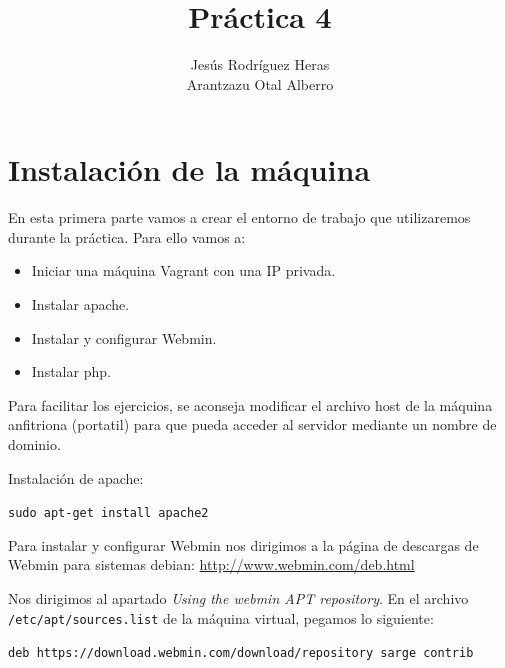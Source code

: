 \documentclass[12pt,letterpaper]{article}
\title{Práctica 4}
\author{Jesús Rodríguez Heras\\
	Arantzazu Otal Alberro}
\begin{document}
	
	\maketitle
%			
	\thispagestyle{empty}
	\newpage
	
	
	
	
	
	\lstset{language=bash, numbers=left, numberstyle=\tiny, numbersep=10pt, firstnumber=1, stepnumber=1, basicstyle=\small\ttfamily, tabsize=1, extendedchars=true, inputencoding=utf8/latin1, breaklines=true}
	
\section{Instalación de la máquina}
En esta primera parte vamos a crear el entorno de trabajo que utilizaremos durante la práctica. Para ello vamos a:
\begin{itemize}
	\item Iniciar una máquina Vagrant con una IP privada.
	\item Instalar apache.
	\item Instalar y configurar Webmin.
	\item Instalar php.
\end{itemize}

Para facilitar los ejercicios, se aconseja modificar el archivo host de la máquina anfitriona (portatil) para que pueda acceder al servidor mediante un nombre de dominio.

Instalación de apache:
\begin{center}
	\texttt{sudo apt-get install apache2}
\end{center}

Para instalar y configurar Webmin nos dirigimos a la página de descargas de Webmin para sistemas debian: \url{http://www.webmin.com/deb.html}

Nos dirigimos al apartado \textit{Using the webmin APT repository}. En el archivo \texttt{/etc/apt/sources.list} de la máquina virtual, pegamos lo siguiente:
\begin{center}
	\texttt{deb https://download.webmin.com/download/repository sarge contrib}
\end{center}
\end{document}
